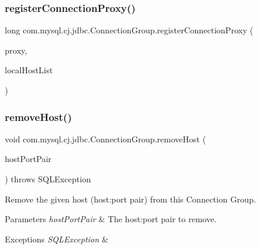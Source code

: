 \subsubsection{\texorpdfstring{register\+Connection\+Proxy()}{registerConnectionProxy()}}
{\footnotesize\ttfamily long com.\+mysql.\+cj.\+jdbc.\+Connection\+Group.\+register\+Connection\+Proxy (\begin{DoxyParamCaption}\item[{\mbox{\hyperlink{classcom_1_1mysql_1_1cj_1_1jdbc_1_1ha_1_1_load_balanced_connection_proxy}{Load\+Balanced\+Connection\+Proxy}}}]{proxy,  }\item[{List$<$ String $>$}]{local\+Host\+List }\end{DoxyParamCaption})}

\mbox{\label{classcom_1_1mysql_1_1cj_1_1jdbc_1_1_connection_group_a688ad628516ef76db003381b4180c175}} 
\subsubsection{\texorpdfstring{remove\+Host()}{removeHost()}\hspace{0.1cm}{\footnotesize\ttfamily [1/3]}}
{\footnotesize\ttfamily void com.\+mysql.\+cj.\+jdbc.\+Connection\+Group.\+remove\+Host (\begin{DoxyParamCaption}\item[{String}]{host\+Port\+Pair }\end{DoxyParamCaption}) throws S\+Q\+L\+Exception}

Remove the given host (host\+:port pair) from this Connection Group.


\begin{DoxyParams}{Parameters}
{\em host\+Port\+Pair} & The host\+:port pair to remove. \\
\hline
\end{DoxyParams}

\begin{DoxyExceptions}{Exceptions}
{\em S\+Q\+L\+Exception} & \\
\hline
\end{DoxyExceptions}
\mbox{\label{classcom_1_1mysql_1_1cj_1_1jdbc_1_1_connection_group_a129dcc7b87611dee38ad5f28ec59d1af}} 
